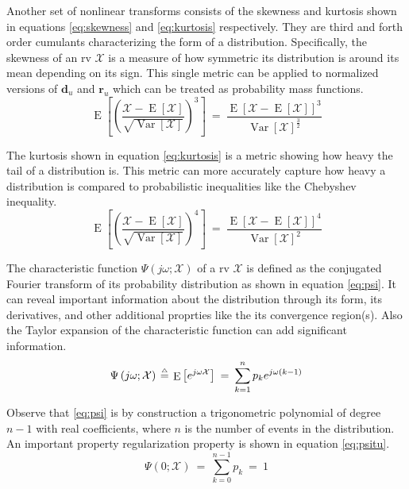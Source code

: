 \documentclass[conference, compsoc, final]{IEEEtran}
\DeclareMathOperator{\bmopmean}{E}
\DeclareMathOperator{\bmopvar}{Var}
\newcommand{\bmdef}{{\buildrel{{\mathsmaller{\triangle}}}\over{=}}}
\newcommand{\bmparen}[1]{\left({#1}\right)}
\newcommand{\bmvec}[1]{\mathbf{#1}}
\newcommand{\bmrv}[1]{\mathcal{#1}}
\newcommand{\bmmean}[1]{\bmopmean\left[{#1}\right]}
\newcommand{\bmvar}[1]{\bmopvar\left[{#1}\right]}
\begin{document}
Another set of nonlinear transforms consists of the skewness and kurtosis shown in equations \eqref{eq:skewness} and \eqref{eq:kurtosis} respectively. They are third and forth order cumulants characterizing the form of a distribution. Specifically, the skewness of an rv $\bmrv{X}$ is a measure of how symmetric its distribution is around its mean depending on its sign. This single metric can be applied to normalized versions of $\bmvec{d}_u$ and $\bmvec{r}_u$ which can be treated as probability mass functions.
\begin{equation}
\bmmean{\bmparen{\dfrac{\bmrv{X} - \bmmean{\bmrv{X}}}{\sqrt{\bmvar{\bmrv{X}}}}}^3}  \:=\:
    \dfrac{\bmmean{\bmrv{X}-\bmmean{\bmrv{X}}}^3}{\bmvar{\bmrv{X}}^{\frac{3}{2}}}
\label{eq:skewness}
\end{equation}

The kurtosis shown in equation \eqref{eq:kurtosis} is a metric showing how heavy the tail of a distribution is. This metric can more accurately capture how heavy a distribution is compared to probabilistic inequalities like the Chebyshev inequality.
\begin{equation}
\bmmean{\bmparen{\dfrac{\bmrv{X} - \bmmean{\bmrv{X}}}{\sqrt{\bmvar{\bmrv{X}}}}}^4}  \:=\:
    \dfrac{\bmmean{\bmrv{X}-\bmmean{\bmrv{X}}}^4}{\bmvar{\bmrv{X}}^2}
\label{eq:kurtosis}
\end{equation}

The characteristic function $\Psi\bmparen{j\omega; \bmrv{X}}$ of a rv $\bmrv{X}$ is defined as the conjugated Fourier transform of its probability distribution as shown in equation \eqref{eq:psi}. It can reveal important information about the distribution through its form, its derivatives, and other additional proprties like the its convergence region(s). Also the Taylor expansion of the characteristic function can add significant information.
\begin{equation}
\Psi\bmparen{j\omega; \bmrv{X}}  \:\bmdef\:
    \bmmean{e^{j \omega \bmrv{X}}}  \:=\:
    \sum_{k=1}^n p_k e^{j\omega\bmparen{k-1}}
\label{eq:psi}
\end{equation}

Observe that \eqref{eq:psi} is by construction a trigonometric polynomial of degree $n-1$ with real coefficients, where $n$ is the number of events in the distribution. An important property regularization property is shown in equation \eqref{eq:psitu}.
\begin{equation}
\Psi\bmparen{0; \bmrv{X}}  \:=\:
    \sum_{k=0}^{n-1}p_k  \:=\:
    1
\label{eq:psitu}
\end{equation}
\end{document}
